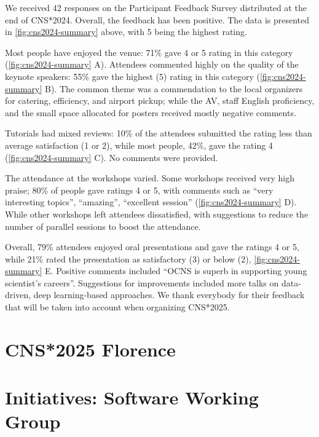 \documentclass[11pt,a4paper,oneside]{article}
\begin{document}
\noindent{}We received 42 responses on the Participant Feedback Survey distributed at the end of CNS*2024.
Overall, the feedback has been positive. The data is presented in \cref{fig:cns2024-summary} above, with 5 being the highest rating.

Most people have enjoyed the venue: 71\% gave 4 or 5 rating in this category (\cref{fig:cns2024-summary} A).
Attendees commented highly on the quality of the keynote speakers: 55\% gave the highest (5) rating in this category (\cref{fig:cns2024-summary} B).
The common theme was a commendation to the local organizers for catering, efficiency, and airport pickup; while the AV, staff English proficiency, and the small space allocated for posters received mostly negative comments.

Tutorials had mixed reviews: 10\% of the attendees submitted the rating less than average satisfaction (1 or 2), while most people, 42\%, gave the rating 4 (\cref{fig:cns2024-summary} C). No comments were provided.

The attendance at the workshops varied.
Some workshops received very high praise; 80\% of people gave ratings 4 or 5, with comments such as \enquote{very interesting topics}, \enquote{amazing}, \enquote{excellent session} (\cref{fig:cns2024-summary} D).
While other workshops left attendees dissatisfied, with suggestions to reduce the number of parallel sessions to boost the attendance.

Overall, 79\% attendees enjoyed oral presentations and gave the ratings 4 or 5, while 21\% rated the presentation as satisfactory (3) or below (2), \cref{fig:cns2024-summary} E.
Positive comments included \enquote{OCNS is superb in supporting young scientist's careers}.
Suggestions for improvements included more talks on data-driven, deep learning-based approaches.
We thank everybody for their feedback that will be taken into account when organizing CNS*2025.


\clearpage

\section*{CNS*2025 Florence}%
\lipsum[1-3]

\clearpage
\section*{Initiatives: Software Working Group}%
\lipsum[1-3]
\end{document}
